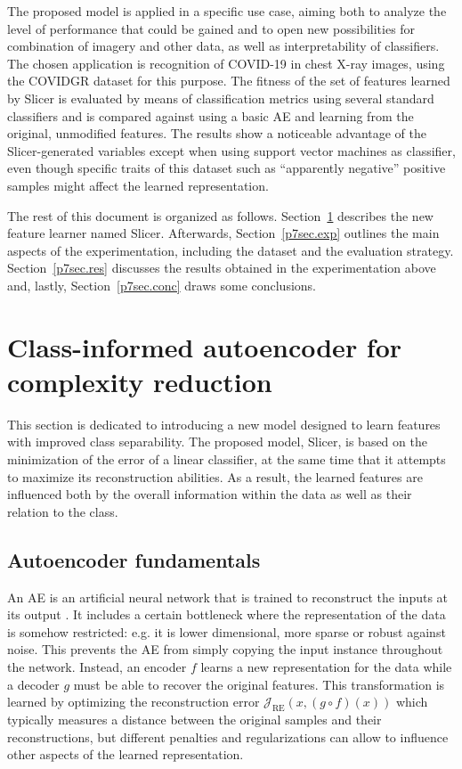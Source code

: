 The proposed model is applied in a specific use case, aiming both to analyze the level of performance that could be gained and to open new possibilities for combination of imagery and other data, as well as interpretability of classifiers. The chosen application is recognition of COVID-19 in chest X-ray images, using the COVIDGR dataset \cite{9254002} for this purpose. The fitness of the set of features learned by Slicer is evaluated by means of classification metrics using several standard classifiers and is compared against using a basic AE and learning from the original, unmodified features. The results show a noticeable advantage of the Slicer-generated variables except when using support vector machines as classifier, even though specific traits of this dataset such as ``apparently negative'' positive samples might affect the learned representation.

The rest of this document is organized as follows. Section~\ref{p7sec.method} describes the new feature learner named Slicer. Afterwards, Section~\ref{p7sec.exp} outlines the main aspects of the experimentation, including the dataset and the evaluation strategy. Section~\ref{p7sec.res} discusses the results obtained in the experimentation above and, lastly, Section~\ref{p7sec.conc} draws some conclusions.

\section{Class-informed autoencoder for complexity reduction}\label{p7sec.method}

This section is dedicated to introducing a new model designed to learn features with improved class separability. The proposed model, Slicer, is based on the minimization of the error of a linear classifier, at the same time that it attempts to maximize its reconstruction abilities. As a result, the learned features are influenced both by the overall information within the data as well as their relation to the class.

\subsection{Autoencoder fundamentals}

An AE is an artificial neural network that is trained to reconstruct the inputs at its output \cite{charte-tutorial}. It includes a certain bottleneck where the representation of the data is somehow restricted: e.g. it is lower dimensional, more sparse or robust against noise. This prevents the AE from simply copying the input instance throughout the network. Instead, an encoder $f$ learns a new representation for the data while a decoder $g$ must be able to recover the original features. This transformation is learned by optimizing the reconstruction error $\mathcal J_{\operatorname{RE}}(x,(g\circ f)(x))$ which typically measures a distance between the original samples and their reconstructions, but different penalties and regularizations can allow to influence other aspects of the learned representation.

